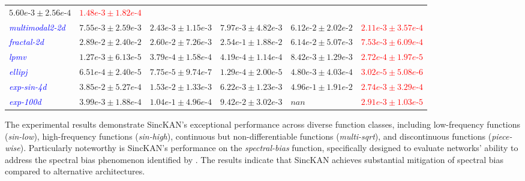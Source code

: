 \begin{table}[ht]
\begin{center}
\begin{adjustbox}{width=\columnwidth, center}
\begin{tabular}{llllll}
$5.60e\mbox{-}3 \pm 2.56 e\mbox{-}4$ &
\textcolor{red}{$1.48e\mbox{-}3 \pm 1.82 e\mbox{-}4$} \\
\textcolor{blue}{\textit{multimodal2-2d}} & $7.55e\mbox{-}3 \pm 2.59 e\mbox{-}3$ & $2.43e\mbox{-}3 \pm 1.15e\mbox{-}3$ & $7.97e\mbox{-}3 \pm 4.82 e\mbox{-}3$ &
$6.12e\mbox{-}2 \pm 2.02e\mbox{-}2$ &
\textcolor{red}{$2.11e\mbox{-}3 \pm 3.57e\mbox{-}4$} \\
\textcolor{blue}{\textit{fractal-2d}} & $2.89e\mbox{-}2 \pm 2.40 e\mbox{-}2$ & $2.60e\mbox{-}2 \pm 7.26e\mbox{-}3$ & $2.54e\mbox{-}1 \pm 1.88 e\mbox{-}2$ &
$6.14e\mbox{-}2 \pm 5.07e\mbox{-}3$ &
\textcolor{red}{$7.53e\mbox{-}3 \pm 6.09e\mbox{-}4$} \\
\textcolor{blue}{\textit{lpmv}} & $1.27e\mbox{-}3 \pm 6.13 e\mbox{-}5$ & $3.79e\mbox{-}4 \pm 1.58e\mbox{-}4$ & $4.19e\mbox{-}4 \pm 1.14 e\mbox{-}4$ &
$8.42e\mbox{-}3 \pm 1.29 e\mbox{-}3$ &
\textcolor{red}{$2.72e\mbox{-}4 \pm 1.97 e\mbox{-}5$} \\
\textcolor{blue}{\textit{ellipj}} & $6.51e\mbox{-}4 \pm 2.40 e\mbox{-}5$ & $7.75e\mbox{-}5 \pm 9.74e\mbox{-}7$ & $1.29e\mbox{-}4 \pm 2.00 e\mbox{-}5$ &
$4.80e\mbox{-}3 \pm 4.03 e\mbox{-}4$ &
\textcolor{red}{$3.02e\mbox{-}5 \pm 5.08 e\mbox{-}6$} \\
\textcolor{blue}{\textit{exp-sin-4d}} & $3.85e\mbox{-}2 \pm 5.27 e\mbox{-}4$ & $1.53e\mbox{-}2 \pm 1.33e\mbox{-}3$ & $6.22e\mbox{-}3 \pm 1.23 e\mbox{-}3$ &
$4.96e\mbox{-}1 \pm 1.91e\mbox{-}2$ &
\textcolor{red}{$2.74e\mbox{-}3 \pm 3.29e\mbox{-}4$} \\
\textcolor{blue}{\textit{exp-100d}} & $3.99e\mbox{-}3 \pm 1.88 e\mbox{-}4$ & $1.04e\mbox{-}1 \pm 4.96e\mbox{-}4$ & $9.42e\mbox{-}2 \pm 3.02 e\mbox{-}3$ &
$nan$ &
\textcolor{red}{$2.91e\mbox{-}3 \pm 1.03 e\mbox{-}5$} \\
\end{tabular}
\end{adjustbox}
\end{center}
\end{table}
The experimental results demonstrate SincKAN's exceptional performance across diverse function classes, including low-frequency functions (\textit{sin-low}), high-frequency functions (\textit{sin-high}), continuous but non-differentiable functions (\textit{multi-sqrt}), and discontinuous functions (\textit{piece-wise}). Particularly noteworthy is SincKAN's performance on the \textit{spectral-bias} function, specifically designed to evaluate networks' ability to address the spectral bias phenomenon identified by \citep{rahaman2019spectral}. The results indicate that SincKAN achieves substantial mitigation of spectral bias compared to alternative architectures.


